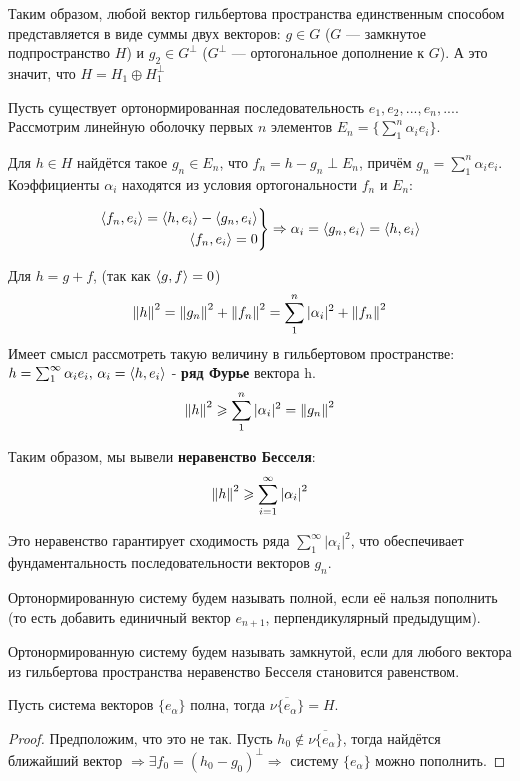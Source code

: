 \documentclass[12pt]{article}
\begin{document}
	Таким образом, любой вектор гильбертова пространства единственным
	способом представляется в виде суммы двух векторов:
	$g \in G$ ($G$ --- замкнутое подпространство $H$) и $g_2 \in G^\perp$ ($G^\perp$ --- ортогональное дополнение к $G$).
	А это значит, что $H = H_1 \oplus H_1^\perp$
	
	Пусть существует ортонормированная последовательность $e_1, e_2, ..., e_n, ...$. Рассмотрим линейную 
	оболочку первых $n$ элементов $E_n = \{ \sum_1^n \alpha_i e_i \}$.

	Для $h \in H$ найдётся такое $g_n \in E_n$, что $f_n = h - g_n \perp E_n$, причём 
	$g_n = \sum_1^n \alpha_i e_i$. Коэффициенты $\alpha_i$ находятся из условия ортогональности $f_n$ и $E_n$:

    $$
        \left.
        \begin{aligned}
            \left\langle f_n, e_i \right\rangle = \left\langle h, e_i \right\rangle - \left\langle g_n, e_i \right\rangle \\
            \left\langle f_n, e_i \right\rangle = 0
        \end{aligned}
        \right\} \Rightarrow \alpha_i = \left\langle g_n, e_i \right\rangle = \left\langle h, e_i \right\rangle
    $$

	Для $h = g + f$, (так как $\left\langle g, f \right\rangle = 0$)
	$$ \left\| h \right\|^2 = \left\| g_n \right\|^2 + \left\| f_n \right\|^2 = \sum_1^n |\alpha_i|^2 + \left\| f_n \right\|^2$$
	Имеет смысл рассмотреть такую величину в гильбертовом пространстве: 
	$h = \sum_1^{\infty} \alpha_i e_i,\, \alpha_i = \left\langle h, e_i \right\rangle$ -
	\textbf{ряд Фурье} вектора h.
	$$ \left\| h \right\|^2 \geqslant \sum_1^n |\alpha_i|^2 = \left\| g_n \right\|^2 $$

	
	Таким образом, мы вывели \textbf{неравенство Бесселя}:
	$$ \left\| h \right\|^2 \geqslant \sum_{i=1}^{\infty} \left| \alpha_i \right|^2 $$

	Это неравенство гарантирует сходимость ряда $\sum_1^{\infty} |\alpha_i|^2$, что обеспечивает фундаментальность 
	последовательности векторов $g_n$.
	
	\begin{defi}
		Ортонормированную систему будем называть полной, если её нальзя пополнить (то есть добавить единичный вектор $e_{n+1}$, 
		перпендикулярный предыдущим).
	\end{defi}
	\begin{defi}
		Ортонормированную систему будем называть замкнутой, если для любого вектора из гильбертова пространства неравенство Бесселя
		становится равенством.
	\end{defi}
	
	\begin{state}
		Пусть система векторов $\{ e_\alpha \}$ полна, тогда $\overline{ \nu \{ e_\alpha \} } = H$.
	\end{state}
	\begin{proof}
		Предположим, что это не так. Пусть $h_0 \notin \overline{ \nu \{ e_\alpha \} }$, тогда найдётся ближайший вектор $\Rightarrow 
		\exists f_0 	= (h_0 - g_0)^\perp	\Rightarrow$ систему $\{ e_{\alpha} \}$ можно пополнить.
	\end{proof}
	
\end{document}
